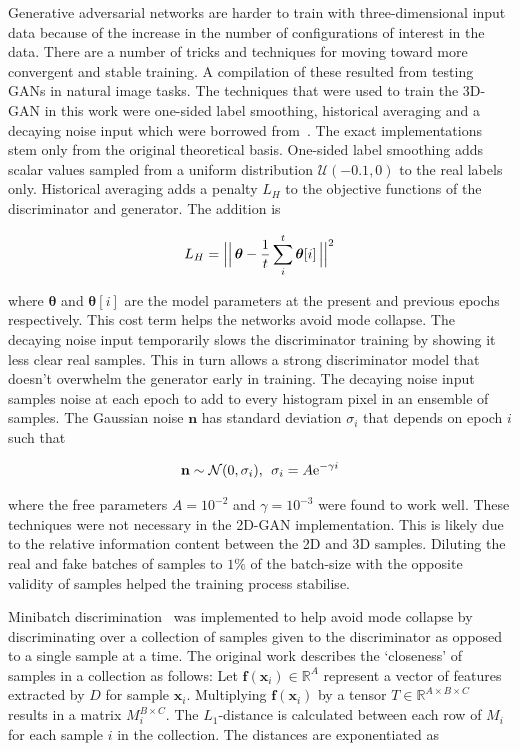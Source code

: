 \documentclass[twocolumn]{article}
\numberwithin{equation}{section}
\begin{document}
Generative adversarial networks are harder to train with three-dimensional input data because of the increase in the number of configurations of interest in the data. There are a number of tricks and techniques for moving toward more convergent and stable training. A compilation of these resulted from testing GANs in natural image tasks. The techniques that were used to train the 3D-GAN in this work were one-sided label smoothing, historical averaging and a decaying noise input which were borrowed from~\cite{gantricks_sali, gan_noise_decay}. The exact implementations stem only from the original theoretical basis. One-sided label smoothing adds scalar values sampled from a uniform distribution $\mathcal{U}(-0.1,0)$ to the real labels only. Historical averaging adds a penalty $L_H$ to the objective functions of the discriminator and generator. The addition is

\begin{equation}
    L_H = \Bigl\lvert\Bigl\lvert \, \bm{\theta} - \frac{1}{t} \sum_i^t\bm{\theta}[i] \,  \Bigr\rvert\Bigr\rvert^2
\end{equation}

where $\bm{\theta}$ and $\bm{\theta}[i]$ are the model parameters at the present and previous epochs respectively. This cost term helps the networks avoid mode collapse. The decaying noise input temporarily slows the discriminator training by showing it less clear real samples. This in turn allows a strong discriminator model that doesn't overwhelm the generator early in training. The decaying noise input samples noise at each epoch to add to every histogram pixel in an ensemble of samples. The Gaussian noise $\mathbf{n}$ has standard deviation $\sigma_i$ that depends on epoch $i$ such that 

\begin{equation}
    \mathbf{n} \sim \mathcal{N}(0,\sigma_i), \: \: \sigma_i = A \textup{e}^{-\gamma i}
\end{equation}

where the free parameters $A=10^{-2}$ and $\gamma=10^{-3}$ were found to work well. These techniques were not necessary in the 2D-GAN implementation. This is likely due to the relative information content between the 2D and 3D samples. Diluting the real and fake batches of samples to $1\%$ of the batch-size with the opposite validity of samples helped the training process stabilise.

Minibatch discrimination~\cite{gantricks_sali} was implemented to help avoid mode collapse by discriminating over a collection of samples given to the discriminator as opposed to a single sample at a time. The original work describes the `closeness' of samples in a collection as follows: Let $\mathbf{f}(\bm{x}_i) \in \mathbb{R}^A$ represent a vector of features extracted by $D$ for sample $\mathbf{x}_i$. Multiplying $\mathbf{f}(\bm{x}_i)$ by a tensor $T \in \mathbb{R}^{A\times B\times C}$ results in a matrix $M_i^{B\times C}$. The $L_1$-distance is calculated between each row of $M_i$ for each sample $i$ in the collection. The distances are exponentiated as
\end{document}
